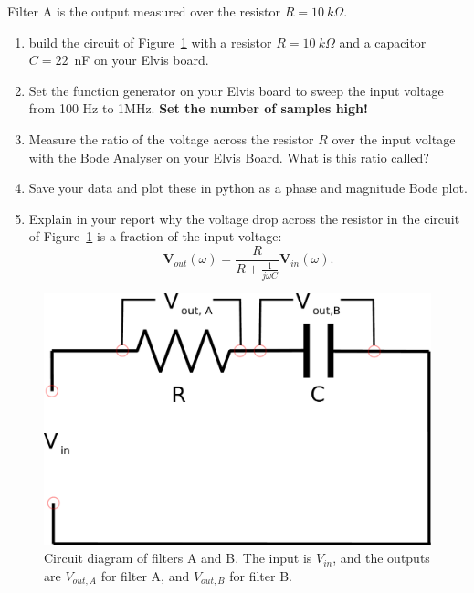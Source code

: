 \documentclass{article}
\begin{document}
Filter A is the output measured over the resistor $R= 10~k\Omega$.
\begin{enumerate}[resume]
\item build the circuit of Figure~\ref{fig:filterAB} with a resistor
  $R=10~k\Omega$ and a capacitor $C=22$~nF on your Elvis board.
\item Set the function generator on your Elvis board to sweep the
  input voltage from 100 Hz to 1MHz. {\bf Set the number of samples high!} 
\item Measure the ratio of the voltage across the resistor $R$ over
  the input voltage with the Bode Analyser on your Elvis Board. What
  is this ratio called?
\item Save your data and plot these in python as a phase and
  magnitude Bode plot.
\item Explain in your report why the voltage drop across the resistor
  in the circuit of Figure~\ref{fig:filterAB} is a fraction of the
  input voltage:
  $$\mathbf{V}_{out}(\omega)=
  \frac{R}{R+{\frac {1}{j\omega C}}}\mathbf{V}_{in}(\omega).$$
\end{enumerate}
\begin{figure}
  \centering
  \includegraphics[width=0.5\columnwidth]{images/RCfilter}
  \caption{Circuit diagram of filters A and B. The input is $V_{in}$,
    and the outputs are $V_{out,A}$ for filter A, and $V_{out,B}$ for
    filter B.}
  \label{fig:filterAB}
\end{figure}
\end{document}
